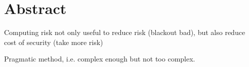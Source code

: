 \chapter*{Abstract}

Computing risk not only useful to reduce risk (blackout bad), but also reduce cost of security (take more risk)

Pragmatic method, i.e. complex enough but not too complex.

